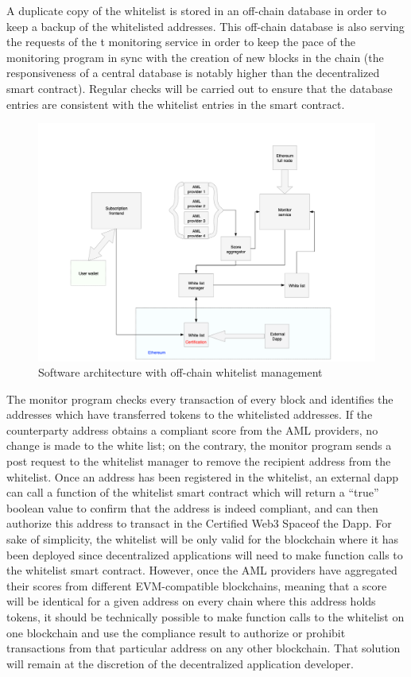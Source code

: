 ﻿\documentclass[a4paper]{article}
\begin{document}
A duplicate copy of the whitelist is stored in an off-chain database in order to keep a backup of the whitelisted addresses. This off-chain database is also serving the requests of the t monitoring service in order to keep the pace of the monitoring program in sync with the creation of new blocks in the chain (the responsiveness of a central database is notably higher than the decentralized smart contract). Regular checks will be carried out to ensure that the database entries are consistent with the whitelist entries in the smart contract. \\
  
\begin{figure}[!h]
\centering
\includegraphics[scale=0.35]{architecture_v1.png}
\caption{Software architecture with off-chain whitelist management}
\label{offchain}
\end{figure}

The monitor program checks every transaction of every block and identifies the addresses which have transferred tokens to the whitelisted addresses. If the counterparty address obtains a compliant score from the AML providers, no change is made to the white list; on the contrary, the monitor program sends a post request to the whitelist manager to remove the recipient address from the whitelist.
Once an address has been registered in the whitelist, an external dapp can call a function of the whitelist smart contract which will return a “true” boolean value to confirm that the address is indeed compliant, and can then authorize this address to transact in the Certified Web3 Space\texttrademark of the Dapp.
For sake of simplicity, the whitelist will be only valid for the blockchain where it has been deployed since decentralized applications will need to make function calls to the whitelist smart contract. However, once the AML providers have aggregated their scores from different EVM-compatible blockchains, meaning that a score will be identical for a given address on every chain where this address holds tokens, it should be technically possible to make function calls to the whitelist on one blockchain and use the compliance result to authorize or prohibit transactions from that particular address on any other blockchain. That solution will remain at the discretion of the decentralized application developer. 
\end{document}
